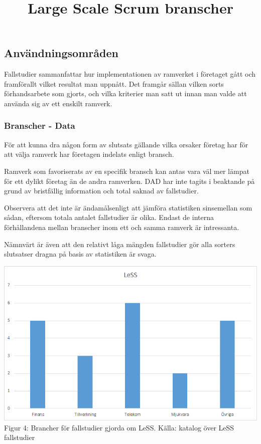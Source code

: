 	
	\subsection{Användningsområden}

		Fallstudier sammanfattar hur implementationen av ramverket i företaget gått och framförallt vilket resultat man uppnått. Det framgår sällan vilken sorts förhandsarbete som gjorts, och vilka kriterier man satt ut innan man valde att använda sig av ett enskilt ramverk.
		
		\subsubsection{Branscher - Data}
			
			För att kunna dra någon form av slutsats gällande vilka orsaker företag har för att välja ramverk har företagen indelats enligt bransch.
					
			Ramverk som favoriserats av en specifik bransch kan antas vara väl mer lämpat för ett dylikt företag än de andra ramverken. DAD har inte tagits i beaktande på grund av bristfällig information och total saknad av fallstudier.
			
			Observera att det inte är ändamålsenligt att jämföra statistiken sinsemellan som sådan, eftersom totala antalet fallstudier är olika. Endast de interna förhållandena mellan branscher inom ett och samma ramverk är intressanta.
				
			Nämnvärt är även att den relativt låga mängden fallstudier gör alla sorters slutsatser dragna på basis av statistiken är svaga.
			
			\title{Large Scale Scrum branscher}
			\begin{center}
				\includegraphics{Grafer/LeSS_brancher.png}
				\\ Figur 4: Brancher för fallstudier gjorda om LeSS. Källa: katalog över LeSS fallstudier \cite{less_casestudies} 
			\end{center}
		
